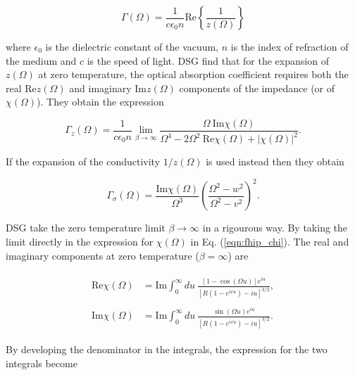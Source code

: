 \begin{equation}
    \Gamma(\Omega) = \frac{1}{c\epsilon_0 n} \text{Re} \left\{ \frac{1}{z(\Omega)} \right\}
\end{equation}

where $\epsilon_0$ is the dielectric constant of the vacuum, $n$ is the index of refraction of the medium and $c$ is the speed of light. DSG find that for the expansion of $z(\Omega)$ at zero temperature, the optical absorption coefficient requires both the real $\text{Re} z(\Omega)$ and imaginary $\text{Im} z(\Omega)$ components of the impedance (or of $\chi(\Omega)$). They obtain the expression

\begin{equation}
    \Gamma_z(\Omega) = \frac{1}{c \epsilon_0 n} \lim_{\beta \to \infty} \frac{\Omega\ \textrm{Im}\chi(\Omega)}{\Omega^4 - 2 \Omega^2\ \textrm{Re} \chi(\Omega) + |\chi(\Omega)|^2}.
\end{equation}

If the expansion of the conductivity $1/z(\Omega)$ is used instead then they obtain

\begin{equation}
    \Gamma_\sigma(\Omega) = \frac{\text{Im}\chi(\Omega)}{\Omega^3} \left( \frac{\Omega^2 - w^2}{\Omega^2 -v^2} \right)^2.
\end{equation}

DSG take the zero temperature limit $\beta \to \infty$ in a rigourous way. By taking the limit directly in the expression for $\chi(\Omega)$ in Eq. (\ref{eqn:fhip_chi}). The real and imaginary components at zero temperature ($\beta = \infty$) are

\begin{subequations}
    \begin{align}
    \begin{split}
        \text{Re} \chi(\Omega) &= \text{Im} \int^{\infty}_0 du\ \frac{\left[1 - \cos(\Omega u)\right] e^{iu}}{\left[R(1-e^{ivu}) - iu\right]^{3/2}},
    \end{split}\\
    \begin{split}
        \text{Im} \chi(\Omega) &= \text{Im} \int^{\infty}_0 du\ \frac{\sin(\Omega u) e^{iu}}{\left[R(1-e^{ivu}) - iu\right]^{3/2}}.
    \end{split}
    \end{align}
\end{subequations}

By developing the denominator in the integrals, the expression for the two integrals become

